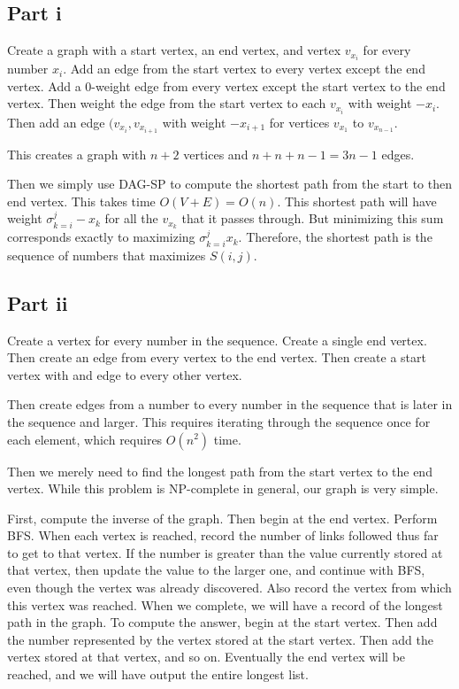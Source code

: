\documentclass[twoside]{amsart}
\begin{document}
\subsection*{Part i}

Create a graph with a start vertex, an end vertex, and vertex
$v_{x_i}$ for every number $x_i$.  Add an edge from the start vertex
to every vertex except the end vertex.  Add a 0-weight edge from every
vertex except the start vertex to the end vertex.  Then weight the
edge from the start vertex to each $v_{x_i}$ with weight $-x_i$.  Then
add an edge $(v_{x_i}, v_{x_{i+1}}$ with weight $-x_{i+1}$ for vertices
$v_{x_1}$ to $v_{x_{n-1}}$.  

This creates a graph with $n+2$ vertices and $n + n + n-1 = 3n-1$
edges.

Then we simply use DAG-SP to compute the shortest path from the start
to then end vertex.  This takes time $O(V+E) = O(n)$.  This shortest
path will have weight $\sigma_{k=i}^j -x_k$ for all the $v_{x_k}$ that
it passes through.  But minimizing this sum corresponds exactly to
maximizing  $\sigma_{k=i}^j x_k$.  Therefore, the shortest path is the
sequence of numbers that maximizes $S(i,j)$.

\subsection*{Part ii}

Create a vertex for every number in the sequence.  Create a single end
vertex. Then create an edge from every vertex to the end vertex.  Then
create a start vertex with and edge to every other vertex.  

Then create edges from a number to every number in the sequence that
is later in the sequence and larger.  This requires iterating through
the sequence once for each element, which requires $O(n^2)$ time.

Then we merely need to find the longest path from the start vertex to
the end vertex.  While this problem is NP-complete in general, our
graph is very simple. 

First, compute the inverse of the graph.  Then begin at the end
vertex.  Perform BFS.  When each vertex is reached, record the number
of links followed thus far to get to that vertex.  If the number is
greater than the value currently stored at that vertex, then update
the value to the larger one, and continue with BFS, even though the
vertex was already discovered.  Also record the vertex from which this
vertex was reached.  When we complete, we will have a record of the
longest path in the graph.  To compute the answer, begin at the start
vertex.  Then add the number represented by the vertex stored at the
start vertex.  Then add the vertex stored at that vertex, and so on.
Eventually the end vertex will be reached, and we will have output the
entire longest list. 
\end{document}
